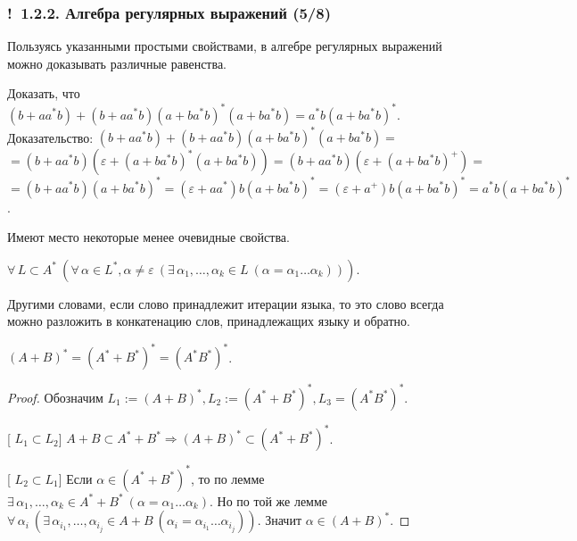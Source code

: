 \documentclass[mathserif,12pt,aspectratio=169]{beamer}
\def\Assign{\operatorname{:=}}
\def\A#1#2{\forall\,#1\ \left(#2\right)}
\def\E#1#2{\exists\,#1\ \left(#2\right)}
\def\Tuple#1#2#3{{#1}_{#2},\dots,{#1}_{#3}}
\let\Impl\Longrightarrow
\def\proofsection#1{\par{\color{brown}\sffamily\small  [\;}{\sffamily\small\color{brown} #1}{\sffamily\small\color{brown}\;]}\;}
\def\Ok{{\color{green}\textbf{!}\ }}
\begin{document}
\begin{frame}
\frametitle{\Ok 1.2.2. Алгебра регулярных выражений (5/8)}

Пользуясь указанными простыми свойствами, в алгебре регулярных выражений
можно доказывать различные равенства.

\begin{example}
 Доказать, что
$(b+aa^*b)+(b+aa^*b)(a+ba^*b)^*(a+ba^*b) = a^*b(a+ba^*b)^*$.
Доказательство:
$(b+aa^*b)+(b+aa^*b)(a+ba^*b)^*(a+ba^*b) =$\\
$=(b+aa^*b)(\varepsilon+(a+ba^*b)^*(a+ba^*b)) =
(b+aa^*b)(\varepsilon+(a+ba^*b)^+) = $\\
$=(b+aa^*b)(a+ba^*b)^* = 
(\varepsilon+aa^*)b(a+ba^*b)^* = (\varepsilon+a^+)b(a+ba^*b)^* = a^*b(a+ba^*b)^*$.
\end{example}

Имеют место некоторые менее очевидные свойства.

\begin{lemma}
$\A{L\subset A^*}
   {\A{\alpha\in L^*, \alpha\neq\varepsilon}
      {\E{\Tuple{\alpha}{1}{k}\in L}
         {\alpha=\alpha_1\dots\alpha_k}
      }
   }$.
\end{lemma}
Другими словами, если слово принадлежит итерации языка, то это слово всегда можно
разложить в конкатенацию слов, принадлежащих языку и обратно.  

\begin{theorem}
$(A+B)^*=(A^*+B^*)^* =(A^*B^*)^*$.
\end{theorem}
\begin{proof}
Обозначим $L_1\Assign (A+B)^*, L_2\Assign 
(A^*+B^*)^*, L_3=(A^*B^*)^*$.
\proofsection{$L_1\subset L_2$}
$A+B\subset A^* + B^* \Impl (A+B)^*\subset 
(A^* + B^*)^*$.
\proofsection{$L_2\subset L_1$}
Если $\alpha\in (A^*+B^*)^*$, то по лемме 
$\E{\Tuple{\alpha}{1}{k}\in A^*+B^*}{\alpha=
\alpha_1\dots\alpha_k}$.
Но по той же лемме
$\A{\alpha_i}{\E{\Tuple{\alpha}{i_1}{i_j}\in A+
B}{\alpha_i=\alpha_{i_1}\dots\alpha_{i_j}}}$.
Значит $\alpha\in (A+B)^*$.
\end{proof}
\end{frame}
\end{document}
